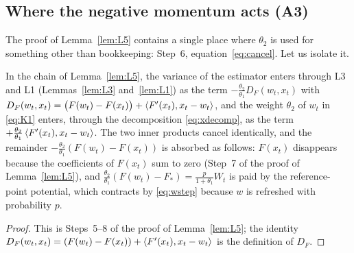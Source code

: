 \subsection{Where the negative momentum acts (A3)}
\label{sec:lk-negmom}

The proof of Lemma~\ref{lem:L5} contains a single place where $\theta_2$ is used for something other than bookkeeping: Step~6, equation~\eqref{eq:cancel}. Let us isolate it.

\begin{proposition}\label{prop:cancel}
In the chain of Lemma~\ref{lem:L5}, the variance of the estimator enters through L3 and L1 (Lemmas~\ref{lem:L3} and~\ref{lem:L1}) as the term $-\frac{\theta_2}{\theta_1}D_F(w_t,x_t)$ with $D_F(w_t,x_t)=\big(F(w_t)-F(x_t)\big)+\left\langle F'(x_t), x_t-w_t \right\rangle$, and the weight $\theta_2$ of $w_t$ in \eqref{eq:K1} enters, through the decomposition \eqref{eq:xdecomp}, as the term $+\frac{\theta_2}{\theta_1}\left\langle F'(x_t), x_t-w_t \right\rangle$. The two inner products cancel identically, and the remainder $-\frac{\theta_2}{\theta_1}(F(w_t)-F(x_t))$ is absorbed as follows: $F(x_t)$ disappears because the coefficients of $F(x_t)$ sum to zero (Step~7 of the proof of Lemma~\ref{lem:L5}), and $\frac{\theta_2}{\theta_1}(F(w_t)-F_\ast)=\frac{p}{1+\theta_1}W_t$ is paid by the reference-point potential, which contracts by \eqref{eq:wstep} because $w$ is refreshed with probability $p$.
\end{proposition}

\begin{proof}
This is Steps~5--8 of the proof of Lemma~\ref{lem:L5}; the identity $D_F(w_t,x_t)=(F(w_t)-F(x_t))+\left\langle F'(x_t), x_t-w_t \right\rangle$ is the definition of $D_F$.
\end{proof}

